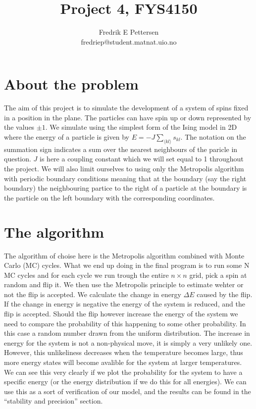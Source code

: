 \documentclass[a4paper,english, 10pt, twoside]{article}
\title{Project 4, FYS4150}
\author{Fredrik E Pettersen\\ fredriep@student.matnat.uio.no}
\begin{document}
\maketitle


\section*{About the problem}
The aim of this project is to simulate the development of a system of spins fixed in a position in the plane. The particles can 
have spin up or down represented by the values $\pm 1$. We simulate using the simplest form of the Ising model in 2D where the energy 
of a particle is given by $E = -J\sum\limits_{\langle kl\rangle}s_{kl}$. The notation on the summation sign indicates a sum over the 
nearest neighbours of the paricle in question. $J$ is here a coupling constant which we will set equal to 1 throughout the project. 
We will also limit ourselves to using only the Metropolis algorithm with periodic boundary conditions meaning that at the boundary 
(say the right boundary) the neighbouring partice to the right of a particle at the boundary is the particle on the left boundary 
with the corresponding coordinates.

\section*{The algorithm}
The algorithm of choise here is the Metropolis algorithm combined with Monte Carlo (MC) cycles. What we end up doing in the final 
program is to run some N MC cycles and for each cycle we run trough the entire $n \times n$ grid, pick a spin at random and flip 
it. We then use the Metropolis principle to estimate wehter or not the flip is accepted. We calculate the change in energy 
$\Delta E$ caused by the flip. If the change in energy is negative the energy of the system is reduced, and the flip is accepted. 
Should the flip however increase the energy of the system we need to compare the probability of this happening to some other 
probability. In this case a random number drawn from the uniform distribution. The increase in energy for the system is not a 
non-physical move, it is simply a very unlikely one. However, this unlikeliness decreases when the temperature becomes large, 
thus more energy states will become avalible for the system at larger temperatures. We can see this very clearly if we plot the 
probability for the system to have a specific energy (or the energy distribution if we do this for all energies). We can use this 
as a sort of verification of our model, and the results can be found in the ``stability and precision'' section.
\end{document}
